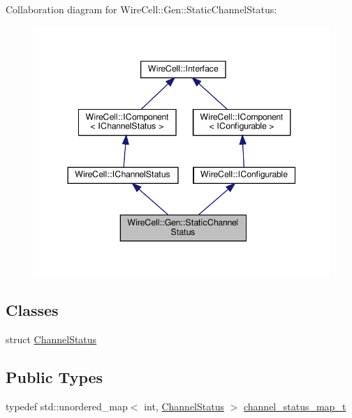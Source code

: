Collaboration diagram for Wire\+Cell\+:\+:Gen\+:\+:Static\+Channel\+Status\+:
\nopagebreak
\begin{figure}[H]
\begin{center}
\leavevmode
\includegraphics[width=344pt]{class_wire_cell_1_1_gen_1_1_static_channel_status__coll__graph}
\end{center}
\end{figure}
\subsection*{Classes}
\begin{DoxyCompactItemize}
\item 
struct \hyperlink{struct_wire_cell_1_1_gen_1_1_static_channel_status_1_1_channel_status}{Channel\+Status}
\end{DoxyCompactItemize}
\subsection*{Public Types}
\begin{DoxyCompactItemize}
\item 
typedef std\+::unordered\+\_\+map$<$ int, \hyperlink{struct_wire_cell_1_1_gen_1_1_static_channel_status_1_1_channel_status}{Channel\+Status} $>$ \hyperlink{class_wire_cell_1_1_gen_1_1_static_channel_status_af2f193308d13e8a6c5815d8021499803}{channel\+\_\+status\+\_\+map\+\_\+t}
\end{DoxyCompactItemize}
